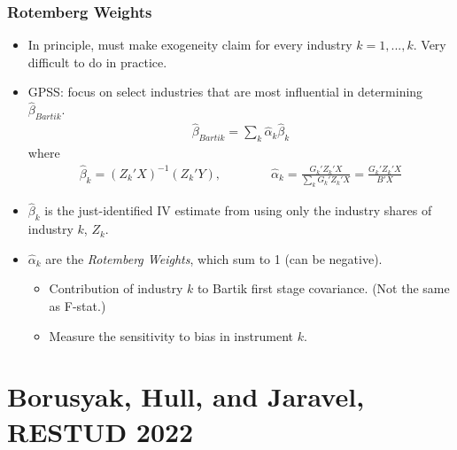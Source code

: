 \documentclass[english,xcolor=svgnames]{beamer}
\begin{document}
\begin{frame}
\frametitle[alignment=center]{Rotemberg Weights}
\begin{itemize}
	\item In principle, must make exogeneity claim for every industry $k=1,...,k$. Very difficult to do in practice.
	\item GPSS: focus on select industries that are most influential in determining $\hat{\beta}_{Bartik}$.
	\begin{align*}
		\hat{\beta}_{Bartik} = \sum_k \hat{\alpha}_k \hat{\beta}_k
	\end{align*}
	where
	\begin{align*}
		\hat{\beta}_k = (Z_k'X)^{-1}(Z_k'Y),\qquad\qquad \hat{\alpha}_k = \frac{G_k' Z_k'X}{\sum_k G_k' Z_k'X} = \frac{G_k' Z_k'X}{B'X}
	\end{align*}
	\item $\hat{\beta}_k$ is the just-identified IV estimate from using only the industry shares of industry $k$, $Z_k$.
	\item $\hat{\alpha}_k$ are the \emph{Rotemberg Weights}, which sum to 1 (can be negative).
	\begin{itemize}
		\item Contribution of industry $k$ to Bartik first stage covariance. (Not the same as F-stat.)
		\item Measure the sensitivity to bias in instrument $k$.
	\end{itemize}
\end{itemize}
\end{frame}


\section{Borusyak, Hull, and Jaravel, RESTUD 2022}
\end{document}

